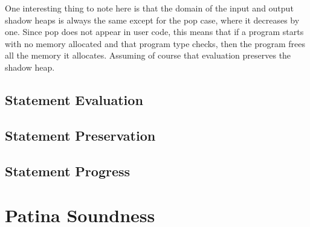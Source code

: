 One interesting thing to note here is that the domain of the input and output shadow heaps
is always the same except for the \textsf{pop} case, where it decreases by one.
Since \textsf{pop} does not appear in user code, this means that if a program starts
with no memory allocated and that program type checks, then the program frees all the
memory it allocates. Assuming of course that evaluation preserves the shadow heap.

\subsection*{Statement Evaluation}

\subsection*{Statement Preservation}
\subsection*{Statement Progress}
\section*{Patina Soundness}
